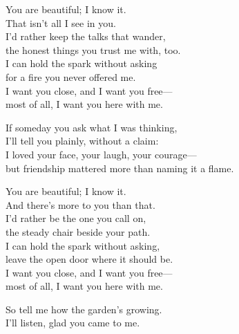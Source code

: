 \begin{lyrics}
You are beautiful; I know it.\\
That isn’t all I see in you.\\
I’d rather keep the talks that wander,\\
the honest things you trust me with, too.\\
I can hold the spark without asking\\
for a fire you never offered me.\\
I want you close, and I want you free—\\
most of all, I want you here with me.

If someday you ask what I was thinking,\\
I’ll tell you plainly, without a claim:\\
I loved your face, your laugh, your courage—\\
but friendship mattered more than naming it a flame.

You are beautiful; I know it.\\
And there’s more to you than that.\\
I’d rather be the one you call on,\\
the steady chair beside your path.\\
I can hold the spark without asking,\\
leave the open door where it should be.\\
I want you close, and I want you free—\\
most of all, I want you here with me.

So tell me how the garden’s growing.\\
I’ll listen, glad you came to me.
\end{lyrics}

